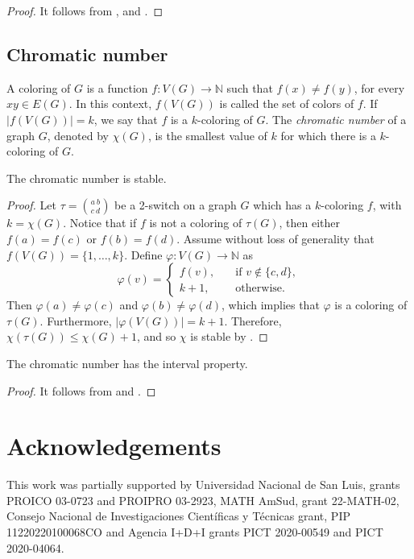 \documentclass{BICA}
\begin{document}
\begin{proof}
	It follows from , and .
\end{proof}

\subsection{Chromatic number}\label{sectionchromatic}

A coloring of $G$ is a function $f:V(G)\rightarrow \mathbb{N}$ such that $f(x)\neq f(y)$, for every $xy\in E(G)$. In this context, $f(V(G))$ is called the set of colors of $f$. If $|f(V(G))|=k$, we say that $f$ is a $k$-coloring of $G$. The \emph{chromatic number} of a graph $G$, denoted by $\chi(G)$, is the smallest value of $k$ for which there is a $k$-coloring of $G$.

\begin{theorem}
	\label{chrom_stable}
The chromatic number is stable.
\end{theorem}

\begin{proof}
	 Let $\tau={{a \ b}\choose{c \ d}}$ be a 2-switch on a graph $G$ which has a $k$-coloring $f$, with $k=\chi(G)$.
	 Notice that if $f$ is not a coloring of $\tau(G)$, then either $f(a)=f(c)$ or $f(b)=f(d)$. Assume without loss of generality that $f(V(G))=\{1,\ldots, k\}$. Define $\varphi:V(G)\rightarrow \mathbb{N}$ as
	 \[
\varphi(v)=\left\lbrace\begin{array}{ll}
f(v),\quad&\text{if }v\not\in\{c,d\},\\
k+1,\quad&\text{otherwise.}
\end{array}\right.
\]
Then $\varphi(a)\neq \varphi(c)$ and $\varphi(b)\neq \varphi(d)$, which implies that $\varphi$ is a coloring of $\tau(G)$.
Furthermore, $|\varphi(V(G))|=k+1$.
Therefore, $\chi(\tau(G)) \leq \chi(G)+1$, and so $\chi$ is stable by .
\end{proof}

\begin{theorem}
	The chromatic number has the interval property.
\end{theorem}

\begin{proof}
	It follows from  and .
\end{proof}

\section*{Acknowledgements}
This work was partially supported by Universidad Nacional de San Luis, grants PROICO 03-0723 and PROIPRO 03-2923, MATH AmSud, grant 22-MATH-02, Consejo Nacional de Investigaciones
Cient\'ificas y T\'ecnicas grant, PIP 11220220100068CO and Agencia I+D+I grants PICT 2020-00549 and PICT 2020-04064.
\end{document}
